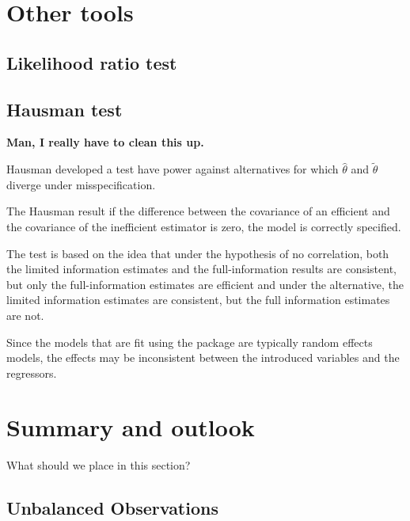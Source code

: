 \documentclass[article]{jss}
\begin{document}
\section{Other tools}


  
\subsection{Likelihood ratio test}

\subsection{Hausman test}

\textbf{Man, I really have to clean this up.}

Hausman \citep{hausman1978} developed a test have power against
alternatives for which $\hat{\theta}$ and $\tilde{\theta}$ diverge
under misspecification.

The Hausman result if the difference between the covariance of an
efficient and the covariance of the inefficient estimator is zero, the
model is correctly specified.  

The test is based on the idea that under the hypothesis of no
correlation, both the limited information estimates and the
full-information results are consistent, but only the full-information
estimates are efficient and under the alternative, the limited
information estimates are consistent, but the full information
estimates are not. 

Since the models that are fit using the  package are
typically random effects models, the effects may be inconsistent
between the introduced variables and the regressors.


\section{Summary and outlook}\label{sec:Summmary}

What should we place in this section?


\subsection{Unbalanced Observations}\label{sec:summary_unbalanced_data}
\end{document}
